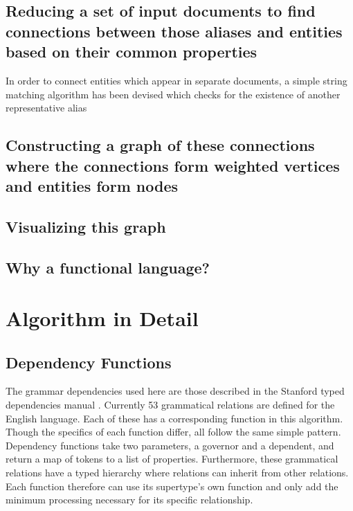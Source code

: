 \documentclass[11pt]{article}
\begin{document}
\subsection{Reducing a set of input documents to find connections between those aliases and entities based on their common properties}

In order to connect entities which appear in separate documents, a simple string matching algorithm has been devised which checks for the existence of another representative alias 

\subsection{Constructing a graph of these connections where the connections form weighted vertices and entities form nodes}

\subsection{Visualizing this graph}

\subsection{Why a functional language?}

\section{Algorithm in Detail}

\subsection{Dependency Functions}

The grammar dependencies used here are those described in the Stanford typed dependencies manual \cite{stanforddep}.  Currently 53 grammatical relations are defined for the English language.  Each of these has a corresponding function in this algorithm.  Though the specifics of each function differ, all follow the same simple pattern.  Dependency functions take two parameters, a governor and a dependent, and return a map of tokens to a list of properties.  Furthermore, these grammatical relations have a typed hierarchy where relations can inherit from other relations.  Each function therefore can use its supertype's own function and only add the minimum processing necessary for its specific relationship.

\end{document}
